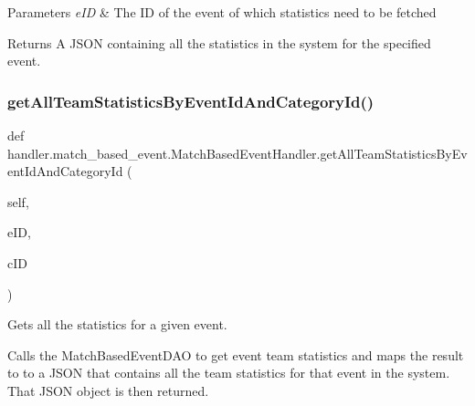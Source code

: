 \begin{DoxyParams}{Parameters}
{\em e\+ID} & The ID of the event of which statistics need to be fetched\\
\hline
\end{DoxyParams}
\begin{DoxyReturn}{Returns}
A J\+S\+ON containing all the statistics in the system for the specified event. 
\end{DoxyReturn}
\mbox{\label{classhandler_1_1match__based__event_1_1_match_based_event_handler_aac09ab67f0980da8a5bda320ff3e4bd9}} 
\subsubsection{\texorpdfstring{get\+All\+Team\+Statistics\+By\+Event\+Id\+And\+Category\+Id()}{getAllTeamStatisticsByEventIdAndCategoryId()}}
{\footnotesize\ttfamily def handler.\+match\+\_\+based\+\_\+event.\+Match\+Based\+Event\+Handler.\+get\+All\+Team\+Statistics\+By\+Event\+Id\+And\+Category\+Id (\begin{DoxyParamCaption}\item[{}]{self,  }\item[{}]{e\+ID,  }\item[{}]{c\+ID }\end{DoxyParamCaption})}



Gets all the statistics for a given event. 

Calls the Match\+Based\+Event\+D\+AO to get event team statistics and maps the result to to a J\+S\+ON that contains all the team statistics for that event in the system. That J\+S\+ON object is then returned.


